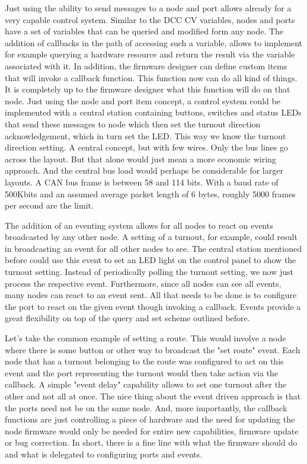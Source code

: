 Just using the ability to send messages to a node and port allows already for a very capable control system. Similar to the DCC CV variables, nodes and ports have a set of variables that can be queried and modified form any node. The addition of callbacks in the path of accessing such a variable, allows to implement for example querying a hardware resource and return the result via the variable associated with it. In addition, the firmware designer can define custom items that will invoke a callback function. This function now can do all kind of things. It is completely up to the firmware designer what this function will do on that node. Just using the node and port item concept, a control system could be implemented with a central station containing buttons, switches and status LEDs that send these messages to node which then set the turnout direction acknowledgement, which in turn set the LED. This way we know the turnout direction setting. A central concept, but with few wires. Only the bus lines go across the layout. But that alone would just mean a more economic wiring approach. And the central bus load would perhaps be considerable for larger layouts. A CAN bus frame is between 58 and 114 bits. With a baud rate of 500Kbits and an assumed average packet length of 6 bytes, roughly 5000 frames per second are the limit.

The addition of an eventing system allows for all nodes to react on events broadcasted by any other node. A setting of a turnout, for example, could result in broadcasting an event for all other nodes to see. The central station mentioned before could use this event to set an LED light on the control panel to show the turnout setting. Instead of periodically polling the turnout setting, we now just process the respective event. Furthermore, since all nodes can see all events, many nodes can react to an event sent. All that needs to be done is to configure the port to react on the given event though invoking a callback. Events provide a great flexibility on top of the query and set scheme outlined before.

Let's take the common example of setting a route. This would involve a node where there is some button or other way to broadcast the "set route" event. Each node that has a turnout belonging to the route was configured to act on this event and the port representing the turnout would then take action via the callback. A simple "event delay" capability allows to set one turnout after the other and not all at once. The nice thing about the event driven approach is that the ports need not be on the same node. And, more importantly, the callback functions are just controlling a piece of hardware and the need for updating the node firmware would only be needed for entire new capabilities, firmware update or bug correction. In short, there is a fine line with what the firmware should do and what is delegated to configuring ports and events.

